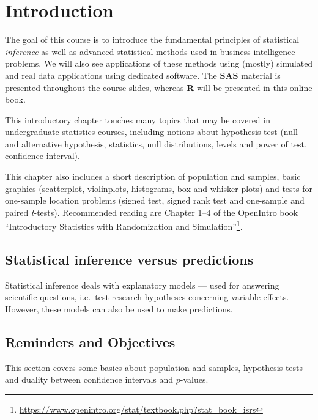 \documentclass[
]{book}
\renewcommand{\href}[2]{#2\footnote{\url{#1}}}
\begin{document}
\hypertarget{introduction}{%
\chapter{Introduction}\label{introduction}}

The goal of this course is to introduce the fundamental principles of statistical \emph{inference} as well as advanced statistical methods used in business intelligence problems. We will also see applications of these methods using (mostly) simulated and real data applications using dedicated software. The \textbf{SAS} material is presented throughout the course slides, whereas \textbf{R} will be presented in this online book.

This introductory chapter touches many topics that may be covered in undergraduate statistics courses, including notions about hypothesis test (null and alternative hypothesis, statistics, null distributions, levels and power of test, confidence interval).

This chapter also includes a short description of population and samples, basic graphics (scatterplot, violinplots, histograms, box-and-whisker plots) and tests for one-sample location problems (signed test, signed rank test and one-sample and paired \emph{t}-tests). Recommended reading are Chapter 1--4 of the OpenIntro book \href{https://www.openintro.org/stat/textbook.php?stat_book=isrs}{``Introductory Statistics with
Randomization and Simulation''}.

\hypertarget{statistical-inference-versus-predictions}{%
\section{Statistical inference versus predictions}\label{statistical-inference-versus-predictions}}

Statistical inference deals with explanatory models --- used for answering scientific questions, i.e.~test research hypotheses concerning variable effects. However, these models can also be used to make predictions.

\hypertarget{reminders-and-objectives}{%
\section{Reminders and Objectives}\label{reminders-and-objectives}}

This section covers some basics about population and samples, hypothesis tests and duality between confidence intervals and \(p\)-values.
\end{document}
